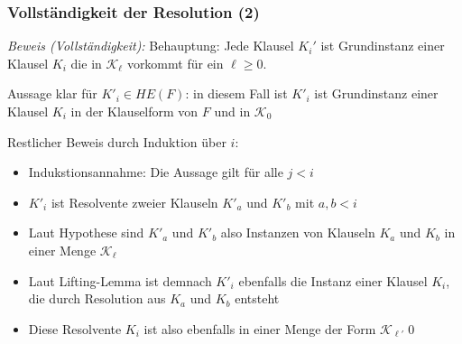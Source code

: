 \documentclass[onlymath]{beamer}
\begin{document}
\begin{frame}[t]\frametitle{Vollständigkeit der Resolution (2)}


\emph{Beweis (Vollständigkeit):} \alert{Behauptung:} Jede Klausel $K_i'$ ist Grundinstanz einer Klausel $K_i$ die in $\mathcal{K}_\ell$ vorkommt für ein $\ell\geq 0$.
\medskip\pause

Aussage klar für $K'_i\in HE(F)$: in diesem Fall ist $K'_i$ ist Grundinstanz einer Klausel $K_i$ in der Klauselform von $F$ und in $\mathcal{K}_0$\medskip\pause

Restlicher Beweis durch Induktion über $i$:
\begin{itemize}
\item Indukstionsannahme: Die Aussage gilt für alle $j<i$\pause
\item $K'_i$ ist Resolvente zweier Klauseln $K'_a$ und $K'_b$ mit $a,b<i$\pause
\item Laut Hypothese sind $K'_a$ und $K'_b$ also Instanzen von Klauseln $K_a$ und $K_b$ in einer Menge $\mathcal{K}_\ell$\pause
\item Laut Lifting-Lemma ist demnach $K'_i$ ebenfalls die Instanz einer Klausel $K_i$, die durch Resolution aus $K_a$ und $K_b$ entsteht\pause
\item Diese Resolvente $K_i$ ist also ebenfalls in einer Menge der Form $\mathcal{K}_{\ell'}$\qed
\end{itemize}

\end{frame}
\end{document}

